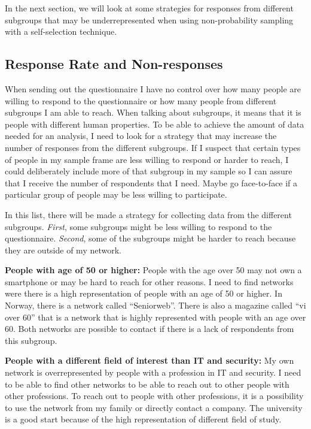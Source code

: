     In the next section, we will look at some strategies for responses from different subgroups that may be underrepresented when using non-probability sampling with a self-selection technique. 

  \subsection{Response Rate and Non-responses} \label{sec:response}

    When sending out the questionnaire I have no control over how many people are willing to respond to the questionnaire or how many people from different subgroups I am able to reach. When talking about subgroups, it means that it is people with different human properties. To be able to achieve the amount of data needed for an analysis, I need to look for a strategy that may increase the number of responses from the different subgroups. If I suspect that certain types of people in my sample frame are less willing to respond or harder to reach, I could deliberately include more of that subgroup in my sample so I can assure that I receive the number of respondents that I need. Maybe go face-to-face if a particular group of people may be less willing to participate.

    In this list, there will be made a strategy for collecting data from the different subgroups. {\it First}, some subgroups might be less willing to respond to the questionnaire. {\it Second}, some of the subgroups might be harder to reach because they are outside of my network.

    {\bf People with age of 50 or higher:} People with the age over 50 may not own a smartphone or may be hard to reach for other reasons. I need to find networks were there is a high representation of people with an age of 50 or higher. In Norway, there is a network called ``Seniorweb''. There is also a magazine called ``vi over 60'' that is a network that is highly represented with people with an age over 60. Both networks are possible to contact if there is a lack of respondents from this subgroup.

    {\bf People with a different field of interest than IT and security:} My own network is overrepresented by people with a profession in IT and security. I need to be able to find other networks to be able to reach out to other people with other professions. To reach out to people with other professions, it is a possibility to use the network from my family or directly contact a company. The university is a good start because of the high representation of different field of study.

